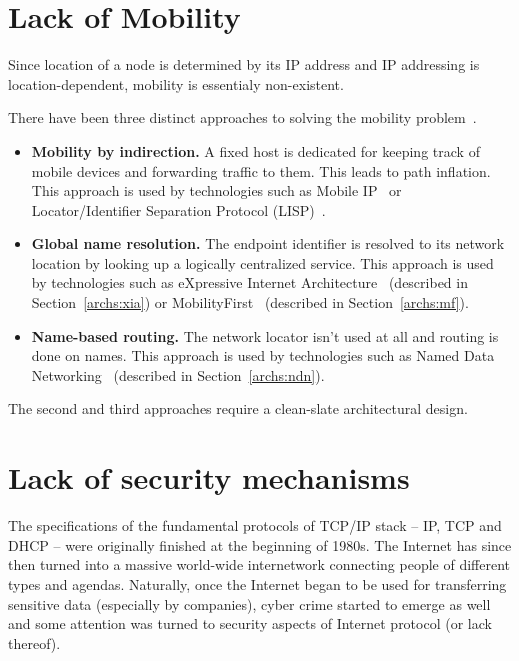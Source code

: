     \section{Lack of Mobility}\label{problems:mobility}

        Since location of a node is determined by its IP address and IP addressing is location-dependent, mobility is essentialy non-existent.

        There have been three distinct approaches to solving the mobility problem~\cite{MobilityFirst}.

        \begin{itemize}
            \item \textbf{Mobility by indirection.} A fixed host is dedicated for keeping track of mobile devices and forwarding traffic to them. This leads to path inflation.
            This approach is used by technologies such as Mobile IP~\cite{rfc5944} or Locator/Identifier Separation Protocol (LISP)~\cite{rfc6830}.
            \item \textbf{Global name resolution.} The endpoint identifier is resolved to its network location by looking up a logically centralized service.
            This approach is used by technologies such as eXpressive Internet Architecture~\cite{xia} (described in Section~\ref{archs:xia}) or MobilityFirst~\cite{MobilityFirst} (described in Section~\ref{archs:mf}).
            \item \textbf{Name-based routing.} The network locator isn't used at all and routing is done on names.
            This approach is used by technologies such as Named Data Networking~\cite{ndn} (described in Section~\ref{archs:ndn}).
        \end{itemize}

        The second and third approaches require a clean-slate architectural design.

    \section{Lack of security mechanisms}\label{problems:security}

        The specifications of the fundamental protocols of TCP/IP stack -- IP, TCP and DHCP -- were originally finished at the beginning of 1980s. The Internet has since then turned into a massive world-wide internetwork connecting people of different types and agendas. Naturally, once the Internet began to be used for transferring sensitive data (especially by companies), cyber crime started to emerge as well and some attention was turned to security aspects of Internet protocol (or lack thereof).


